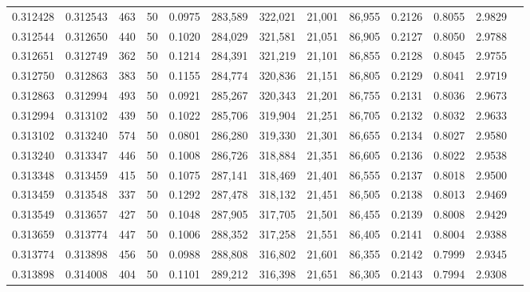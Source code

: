 \begin{tabular}{rrrrrrrrrrrrr}
0.312428 & 0.312543 &   463 &  50 &                                     0.0975 & 283,589 & 322,021 &  21,001 &  86,955 & 0.2126 & 0.8055 & 2.9829 \\
0.312544 & 0.312650 &   440 &  50 &                                     0.1020 & 284,029 & 321,581 &  21,051 &  86,905 & 0.2127 & 0.8050 & 2.9788 \\
0.312651 & 0.312749 &   362 &  50 &                                     0.1214 & 284,391 & 321,219 &  21,101 &  86,855 & 0.2128 & 0.8045 & 2.9755 \\
0.312750 & 0.312863 &   383 &  50 &                                     0.1155 & 284,774 & 320,836 &  21,151 &  86,805 & 0.2129 & 0.8041 & 2.9719 \\
0.312863 & 0.312994 &   493 &  50 &                                     0.0921 & 285,267 & 320,343 &  21,201 &  86,755 & 0.2131 & 0.8036 & 2.9673 \\
0.312994 & 0.313102 &   439 &  50 &                                     0.1022 & 285,706 & 319,904 &  21,251 &  86,705 & 0.2132 & 0.8032 & 2.9633 \\
0.313102 & 0.313240 &   574 &  50 &                                     0.0801 & 286,280 & 319,330 &  21,301 &  86,655 & 0.2134 & 0.8027 & 2.9580 \\
0.313240 & 0.313347 &   446 &  50 &                                     0.1008 & 286,726 & 318,884 &  21,351 &  86,605 & 0.2136 & 0.8022 & 2.9538 \\
0.313348 & 0.313459 &   415 &  50 &                                     0.1075 & 287,141 & 318,469 &  21,401 &  86,555 & 0.2137 & 0.8018 & 2.9500 \\
0.313459 & 0.313548 &   337 &  50 &                                     0.1292 & 287,478 & 318,132 &  21,451 &  86,505 & 0.2138 & 0.8013 & 2.9469 \\
0.313549 & 0.313657 &   427 &  50 &                                     0.1048 & 287,905 & 317,705 &  21,501 &  86,455 & 0.2139 & 0.8008 & 2.9429 \\
0.313659 & 0.313774 &   447 &  50 &                                     0.1006 & 288,352 & 317,258 &  21,551 &  86,405 & 0.2141 & 0.8004 & 2.9388 \\
0.313774 & 0.313898 &   456 &  50 &                                     0.0988 & 288,808 & 316,802 &  21,601 &  86,355 & 0.2142 & 0.7999 & 2.9345 \\
0.313898 & 0.314008 &   404 &  50 &                                     0.1101 & 289,212 & 316,398 &  21,651 &  86,305 & 0.2143 & 0.7994 & 2.9308 \\

\end{tabular}
